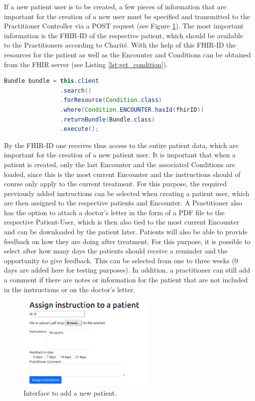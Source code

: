 \documentclass[]{report}
\begin{document}
If a new patient user is to be created, a few pieces of information that are important for the creation of a new user must be specified and transmitted to the Practitioner Controller via a POST request (see Figure \ref{fig:add_patient}). The most important information is the FHIR-ID of the respective patient, which should be available to the Practitioners according to Charité. With the help of this FHIR-ID the resources for the patient as well as the Encounter and Conditions can be obtained from the FHIR server (see Listing \ref{lst:get_condition}).
\begin{lstlisting}[language=Java, label=lst:get_condition, caption={Example how to fetch the conditions for a specific FHIR ID.}]
Bundle bundle = this.client
                .search()
                .forResource(Condition.class)
                .where(Condition.ENCOUNTER.hasId(fhirID))
                .returnBundle(Bundle.class)
                .execute();
\end{lstlisting}
By the FHIR-ID one receives thus access to the entire patient data, which are important for the creation of a new patient user. It is important that when a patient is created, only the last Encounter and the associated Conditions are loaded, since this is the most current Encounter and the instructions should of course only apply to the current treatment. For this purpose, the required previously added instructions can be selected when creating a patient user, which are then assigned to the respective patients and Encounter. A Practitioner also has the option to attach a doctor's letter in the form of a PDF file to the respective Patient-User, which is then also tied to the most current Encounter and can be downloaded by the patient later. Patients will also be able to provide feedback on how they are doing after treatment. For this purpose, it is possible to select after how many days the patients should receive a reminder and the opportunity to give feedback. This can be selected from one to three weeks (0 days are added here for testing purposes). In addition, a practitioner can still add a comment if there are notes or information for the patient that are not included in the instructions or on the doctor's letter.\\
\begin{figure}[h]
    \centering
    \includegraphics[width=0.6\textwidth]{Add_Patient.png}
    \caption{Interface to add a new patient.}
    \label{fig:add_patient}
\end{figure}
\end{document}
